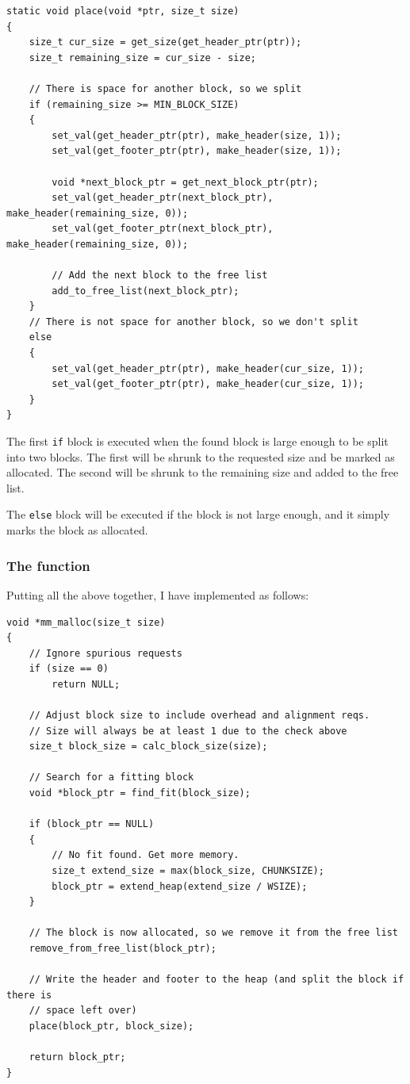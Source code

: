 \bgroup
\small
\begin{verbatim}
static void place(void *ptr, size_t size)
{
    size_t cur_size = get_size(get_header_ptr(ptr));
    size_t remaining_size = cur_size - size;

    // There is space for another block, so we split
    if (remaining_size >= MIN_BLOCK_SIZE)
    {
        set_val(get_header_ptr(ptr), make_header(size, 1));
        set_val(get_footer_ptr(ptr), make_header(size, 1));

        void *next_block_ptr = get_next_block_ptr(ptr);
        set_val(get_header_ptr(next_block_ptr), make_header(remaining_size, 0));
        set_val(get_footer_ptr(next_block_ptr), make_header(remaining_size, 0));

        // Add the next block to the free list
        add_to_free_list(next_block_ptr);
    }
    // There is not space for another block, so we don't split
    else
    {
        set_val(get_header_ptr(ptr), make_header(cur_size, 1));
        set_val(get_footer_ptr(ptr), make_header(cur_size, 1));
    }
}
\end{verbatim}
\egroup

The first \texttt{if} block is executed when the found block is large enough to be split into two blocks. The first will be shrunk to the requested size and be marked as allocated. The second will be shrunk to the remaining size and added to the free list.

The \texttt{else} block will be executed if the block is not large enough, and it simply marks the block as allocated.

\subsubsection{The  function}

Putting all the above together, I have implemented  as follows:

\bgroup
\small
\begin{verbatim}
void *mm_malloc(size_t size)
{
    // Ignore spurious requests
    if (size == 0)
        return NULL;

    // Adjust block size to include overhead and alignment reqs.
    // Size will always be at least 1 due to the check above
    size_t block_size = calc_block_size(size);

    // Search for a fitting block
    void *block_ptr = find_fit(block_size);

    if (block_ptr == NULL)
    {
        // No fit found. Get more memory.
        size_t extend_size = max(block_size, CHUNKSIZE);
        block_ptr = extend_heap(extend_size / WSIZE);
    }

    // The block is now allocated, so we remove it from the free list
    remove_from_free_list(block_ptr);

    // Write the header and footer to the heap (and split the block if there is
    // space left over)
    place(block_ptr, block_size);

    return block_ptr;
}
\end{verbatim}
\egroup

